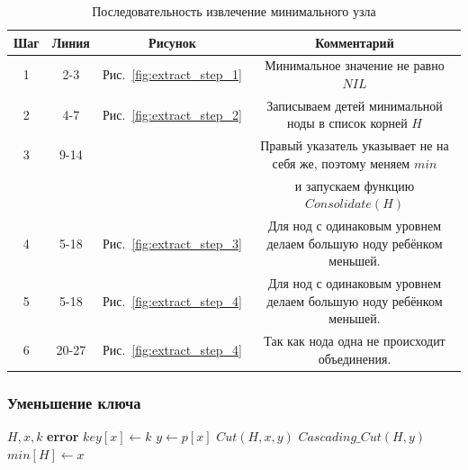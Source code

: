 \documentclass[a4paper,10pt]{article}
\begin{document}
            \begin{table}[h!]
                \caption{Последовательность извлечение минимального узла}
    			\center
                \begin{tabular}{|c|c|c|c|}
                    \hline
                    Шаг  & Линия &  Рисунок                       & Комментарий                \\ \hline
                      1  & 2-3   &  Рис.~\ref{fig:extract_step_1} & Минимальное значение не равно $NIL$ \\ 
                      2  & 4-7   &  Рис.~\ref{fig:extract_step_2} & Записываем детей минимальной ноды в список корней $H$ \\
    				  3  & 9-14  &								  & Правый указатель указывает не на себя же, поэтому меняем $min$ \\
    					 &       &								  & и запускаем функцию $Consolidate(H)$  \\ \hline
    				  4  &  5-18 &	Рис.~\ref{fig:extract_step_3} & Для нод с одинаковым уровнем делаем большую ноду ребёнком меньшей. \\ \hline
    				  5  &  5-18 &	Рис.~\ref{fig:extract_step_4} & Для нод с одинаковым уровнем делаем большую ноду ребёнком меньшей. \\ \hline
					  6  &  20-27&  Рис.~\ref{fig:extract_step_4} & Так как нода одна не происходит объединения. \\ \hline
                \end{tabular}
            \end{table}
        \newpage
        \newpage
        \subsubsection*{Уменьшение ключа}
            \begin{algorithmic}[1]
                 {$H, x, k$}
                        \State \textbf{error} 
                    \EndIf
                    \State $key[x] \gets k$
                    \State $y \gets p[x]$
                        \State $Cut(H, x, y)$
                        \State $Cascading\_Cut(H, y)$
                    \EndIf
                        \State $min[H] \gets x$
                    \EndIf
                \EndFunction
            \end{algorithmic}
\end{document}
